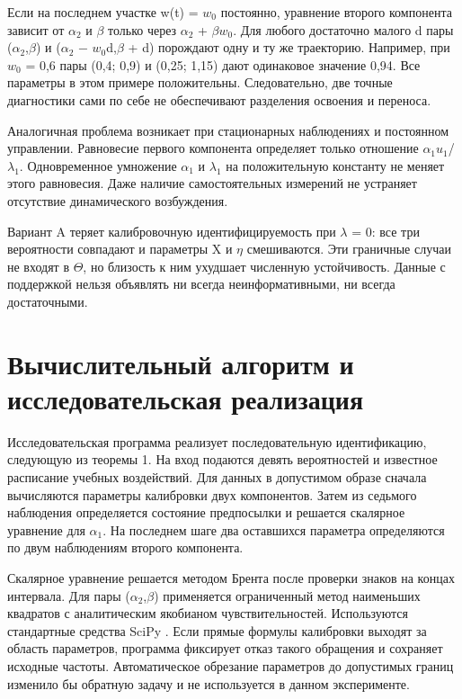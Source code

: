 \documentclass[blind]{psta}
\begin{document}
Если на последнем участке w(t) = $w_{0}$ постоянно, уравнение второго компонента зависит от $\alpha_{2}$ и $\beta$ только через $\alpha_{2}$ + $\beta$$w_{0}$. Для любого достаточно малого d пары ($\alpha_{2}$,$\beta$) и ($\alpha_{2}$ $-$ $w_{0}$d,$\beta$ + d) порождают одну и ту же траекторию. Например, при $w_{0}$ = 0,6 пары (0,4; 0,9) и (0,25; 1,15) дают одинаковое значение 0,94. Все параметры в этом примере положительны. Следовательно, две точные диагностики сами по себе не обеспечивают разделения освоения и переноса.

Аналогичная проблема возникает при стационарных наблюдениях и постоянном управлении. Равновесие первого компонента определяет только отношение $\alpha_{1}$$u_{1}$/$\lambda_{1}$. Одновременное умножение $\alpha_{1}$ и $\lambda_{1}$ на положительную константу не меняет этого равновесия. Даже наличие самостоятельных измерений не устраняет отсутствие динамического возбуждения.

Вариант A теряет калибровочную идентифицируемость при $\lambda$ = 0: все три вероятности совпадают и параметры X и $\eta$ смешиваются. Эти граничные случаи не входят в $\Theta$, но близость к ним ухудшает численную устойчивость. Данные с поддержкой нельзя объявлять ни всегда неинформативными, ни всегда достаточными.

\FloatBarrier
\section{Вычислительный алгоритм и исследовательская реализация}
Исследовательская программа реализует последовательную идентификацию, следующую из теоремы 1. На вход подаются девять вероятностей и известное расписание учебных воздействий. Для данных в допустимом образе сначала вычисляются параметры калибровки двух компонентов. Затем из седьмого наблюдения определяется состояние предпосылки и решается скалярное уравнение для $\alpha_{1}$. На последнем шаге два оставшихся параметра определяются по двум наблюдениям второго компонента.

Скалярное уравнение решается методом Брента после проверки знаков на концах интервала. Для пары ($\alpha_{2}$,$\beta$) применяется ограниченный метод наименьших квадратов с аналитическим якобианом чувствительностей. Используются стандартные средства SciPy \cite{ref15}. Если прямые формулы калибровки выходят за область параметров, программа фиксирует отказ такого обращения и сохраняет исходные частоты. Автоматическое обрезание параметров до допустимых границ изменило бы обратную задачу и не используется в данном эксперименте.
\end{document}
